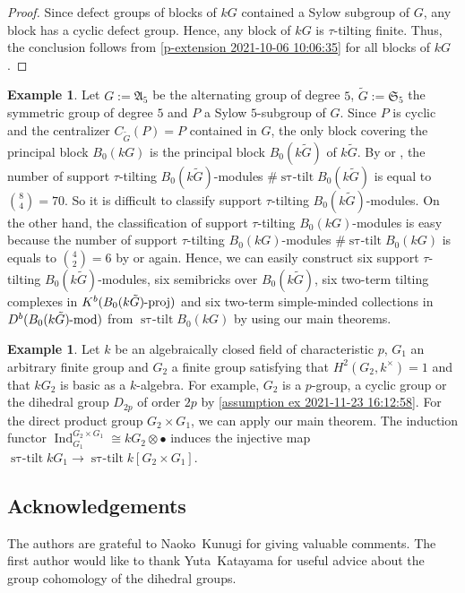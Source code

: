 \documentclass[pdftex,a4paper]{article}
\numberwithin{equation}{subsection}
\theoremstyle{definition}
\newtheorem{example}[theorem]{Example}
\newcommand{\lmod}{\operatorname{\mathrm{\hspace{-2pt}-mod}}}
\newcommand{\lproj}{\operatorname{\mathrm{\hspace{-2pt}-proj}}}
\newcommand{\induc}{{\operatorname{Ind}\nolimits}}
\newcommand{\stautilt}{\operatorname{\mathrm{s\tau-tilt}}}
\begin{document}
\begin{proof}
	Since defect groups of blocks of \(kG\) contained a Sylow subgroup of \(G\), any block has a cyclic defect group.
	Hence, any block of \(kG\) is \(\tau\)-tilting finite.
	Thus, the conclusion follows from \cref{p-extension 2021-10-06 10:06:35} for all blocks of \(kG\).
\end{proof}

\begin{example}
	Let \(G:=\mathfrak{A}_5\) be the alternating group of degree \(5\), \(\tilde{G}:=\mathfrak{S}_5\) the symmetric group of degree \(5\) and \(P\) a Sylow \(5\)-subgroup of \(G\).
	Since \(P\) is cyclic and the centralizer \(C_{\tilde{G}}(P)=P\) contained in \(G\),
	the only block covering the principal block \(B_0(kG)\) is the principal block \(B_0(k\tilde{G})\) of \(k\tilde{G}\).
	By \cite{aoki2019classifying} or \cite{ASASHIBA2020119}, the number of support \(\tau\)-tilting \(B_0(k\tilde{G})\)-modules \(\#\stautilt B_0(k\tilde{G})\) is equal to \(\binom{8}{4}=70\). So it is difficult to classify support \(\tau\)-tilting \(B_0(k\tilde{G})\)-modules.
	On the other hand, the classification of support \(\tau\)-tilting \(B_0(kG)\)-modules is easy because the number of support \(\tau\)-tilting \(B_0(kG)\)-modules \(\#\stautilt{B_0(kG)}\) is equals to \(\binom{4}{2}=6\) by \cite{aoki2019classifying} or \cite{ASASHIBA2020119} again.
	Hence, we can easily construct six support \(\tau\)-tilting \(B_0(k\tilde{G})\)-modules, six semibricks over \(B_0(k\tilde{G})\), six two-term tilting complexes in \(K^b(B_0(k\tilde{G})\lproj)\) and six two-term simple-minded collections in \(D^b(B_0(k\tilde{G})\lmod)\) from \(\stautilt{B_0(kG)}\) by using our main theorems.
\end{example}
\begin{example}
	Let \(k\) be an algebraically closed field of characteristic \(p\), \(G_1\) an arbitrary finite group and \(G_2\) a finite group satisfying that \(H^2(G_2,k^{\times})=1\) and that \(kG_2\) is basic as a \(k\)-algebra.
	For example, \(G_2\) is a \(p\)-group, a cyclic group or the dihedral group \(D_{2p}\) of order \(2p\) by \cref{assumption ex 2021-11-23 16:12:58}.
	For the direct product group \(G_2\times G_1\), we can apply our main theorem.
	The induction functor \(\induc_{G_1}^{G_2\times G_1}\cong kG_2\otimes \bullet\) induces the injective map \(\stautilt kG_1\rightarrow \stautilt k[G_2\times G_1]\).
\end{example}
\subsection*{Acknowledgements}
The authors are grateful to Naoko~Kunugi for giving valuable comments.
The first author would like to thank Yuta~Katayama for useful advice about the group cohomology of the dihedral groups.
% 
% 
\end{document}
